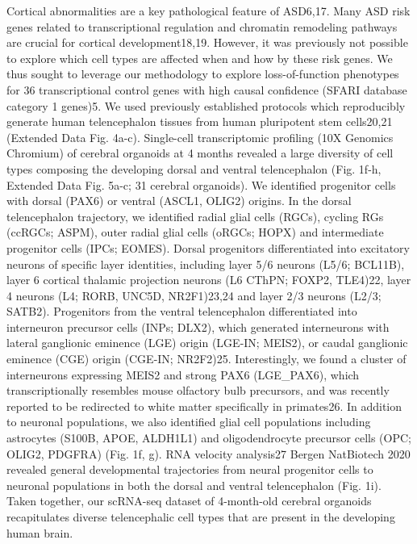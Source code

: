 Cortical abnormalities are a key pathological feature of ASD6,17. Many ASD risk genes related to transcriptional regulation and chromatin remodeling pathways are crucial for cortical development18,19. However, it was previously not possible to explore which cell types are affected when and how by these risk genes. We thus sought to leverage our methodology to explore loss-of-function phenotypes for 36 transcriptional control genes with high causal confidence (SFARI database category 1 genes)5.
We used previously established protocols which reproducibly generate human telencephalon tissues from human pluripotent stem cells20,21 (Extended Data Fig. 4a-c). Single-cell transcriptomic profiling (10X Genomics Chromium) of cerebral organoids at 4 months revealed a large diversity of cell types composing the developing dorsal and ventral telencephalon (Fig. 1f-h, Extended Data Fig. 5a-c; 31 cerebral organoids). We identified progenitor cells with dorsal (PAX6) or ventral (ASCL1, OLIG2) origins. In the dorsal telencephalon trajectory, we identified radial glial cells (RGCs), cycling RGs (ccRGCs; ASPM), outer radial glial cells (oRGCs; HOPX) and intermediate progenitor cells (IPCs; EOMES). Dorsal progenitors differentiated into excitatory neurons of specific layer identities, including layer 5/6 neurons (L5/6; BCL11B), layer 6 cortical thalamic projection neurons (L6 CThPN; FOXP2, TLE4)22,  layer 4 neurons (L4; RORB, UNC5D, NR2F1)23,24 and layer 2/3 neurons (L2/3; SATB2). Progenitors from the ventral telencephalon differentiated into interneuron precursor cells (INPs; DLX2), which generated interneurons with lateral ganglionic eminence (LGE) origin (LGE-IN; MEIS2), or caudal ganglionic eminence (CGE) origin (CGE-IN; NR2F2)25. Interestingly, we found a cluster of interneurons expressing MEIS2 and strong PAX6 (LGE\_PAX6), which transcriptionally resembles mouse olfactory bulb precursors, and was recently reported to be redirected to white matter specifically in primates26. In addition to neuronal populations, we also identified glial cell populations including astrocytes (S100B, APOE, ALDH1L1) and oligodendrocyte precursor cells (OPC; OLIG2, PDGFRA) (Fig. 1f, g). RNA velocity analysis27 {Bergen NatBiotech 2020} revealed general developmental trajectories from neural progenitor cells to neuronal populations in both the dorsal and ventral telencephalon (Fig. 1i). Taken together, our scRNA-seq dataset of 4-month-old cerebral organoids recapitulates diverse telencephalic cell types that are present in the developing human brain. 

